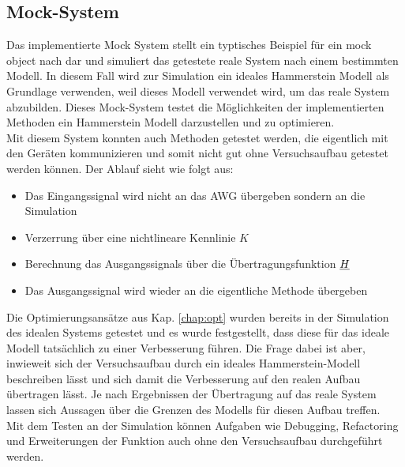 \documentclass[../Report.tex]{subfiles}
\begin{document}
\subsection{Mock-System}
\label{subsec:code.mock}
Das implementierte Mock System stellt ein typtisches Beispiel für ein mock object nach \cite{mock} dar und simuliert das getestete reale System nach einem bestimmten Modell. In diesem Fall wird zur Simulation ein ideales Hammerstein Modell als Grundlage verwenden, weil dieses Modell verwendet wird, um das reale System abzubilden. Dieses Mock-System testet die Möglichkeiten der implementierten Methoden ein Hammerstein Modell darzustellen und zu optimieren.\\
Mit diesem System konnten auch Methoden getestet werden, die eigentlich mit den Geräten kommunizieren und somit nicht gut ohne Versuchsaufbau getestet werden können. Der Ablauf sieht wie folgt aus:
\begin{itemize}
	\item Das Eingangssignal wird nicht an das AWG übergeben sondern an die Simulation
	\item Verzerrung über eine nichtlineare Kennlinie $K$ 
	\item Berechnung das Ausgangssignals über die Übertragungsfunktion $\underline{H}$
	\item Das Ausgangssignal wird wieder an die eigentliche Methode übergeben
\end{itemize}
Die Optimierungsansätze aus Kap. \ref{chap:opt} wurden bereits in der Simulation des idealen Systems getestet und es wurde festgestellt, dass diese für das ideale Modell tatsächlich zu einer Verbesserung führen. Die Frage dabei ist aber, inwieweit sich der Versuchsaufbau durch ein ideales Hammerstein-Modell beschreiben lässt und sich damit die Verbesserung auf den realen Aufbau übertragen lässt. Je nach Ergebnissen der Übertragung auf das reale System lassen sich Aussagen über die Grenzen des Modells für diesen Aufbau treffen.\\
Mit dem Testen an der Simulation können Aufgaben wie Debugging, Refactoring und Erweiterungen der Funktion auch ohne den Versuchsaufbau durchgeführt werden.
\end{document}
